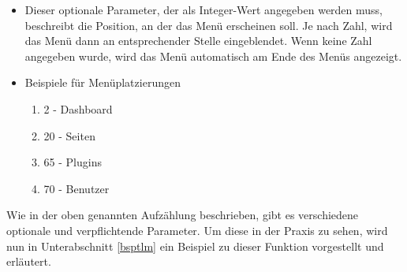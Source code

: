 \begin{enumerate}
	\begin{itemize}
		\item Dieser optionale Parameter, der als Integer-Wert angegeben werden muss, beschreibt die Position, an der das Menü erscheinen soll. Je nach Zahl, wird das Menü dann an entsprechender Stelle eingeblendet. Wenn keine Zahl angegeben wurde, wird das Menü automatisch am Ende des Menüs angezeigt.
		\item Beispiele für Menüplatzierungen
		\begin{enumerate}
			\item 2 - Dashboard
			\item 20 - Seiten
			\item 65 - Plugins
			\item 70 - Benutzer
		\end{enumerate}
	\end{itemize}
\end{enumerate}
Wie in der oben genannten Aufzählung beschrieben, gibt es verschiedene optionale und verpflichtende Parameter. Um diese in der Praxis zu sehen, wird nun in Unterabschnitt \ref{bsptlm} ein Beispiel zu dieser Funktion vorgestellt und erläutert.
